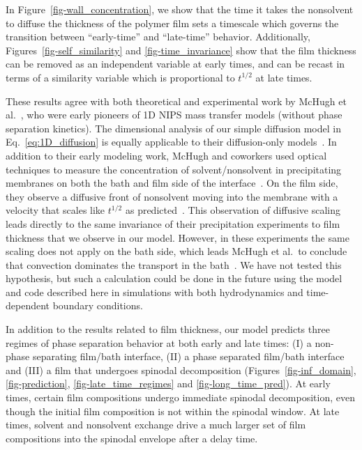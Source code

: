 \documentclass[journal=mamobx, layout=twocolumn]{achemso}
\begin{document}
In Figure~\ref{fig-wall_concentration}, we show that the time it takes the nonsolvent to diffuse the thickness of the polymer film sets a timescale which governs the transition between ``early-time'' and ``late-time'' behavior.
Additionally, Figures~\ref{fig-self_similarity} and \ref{fig-time_invariance} show that the film thickness can be removed as an independent variable at early times, and can be recast in terms of a similarity variable which is proportional to $t^{1/2}$ at late times.

These results agree with both theoretical and experimental work by McHugh et al.~\cite{Tsay1990,McHugh1992,Gaides1992,McHugh1995a}, who were early pioneers of 1D NIPS mass transfer models (without phase separation kinetics). 
The dimensional analysis of our simple diffusion model in Eq.~\ref{eq:1D_diffusion} is equally applicable to their diffusion-only models~\cite{Tsay1990}.
In addition to their early modeling work, McHugh and coworkers used optical techniques to measure the concentration of solvent/nonsolvent in precipitating membranes on both the bath and film side of the interface~\cite{McHugh1992}.
On the film side, they observe a diffusive front of nonsolvent moving into the membrane with a velocity that scales like $t^{1/2}$ as predicted~\cite{McHugh1992,McHugh1995a}.
This observation of diffusive scaling leads directly to the same invariance of their precipitation experiments to film thickness that we observe in our model.
However, in these experiments the same scaling does not apply on the bath side, which leads McHugh et al.\ to conclude that convection dominates the transport in the bath~\cite{Gaides1992}.
We have not tested this hypothesis, but such a calculation could be done in the future using the model and code described here in simulations with both hydrodynamics and time-dependent boundary conditions.

In addition to the results related to film thickness, our model predicts three regimes of phase separation behavior at both early and late times: (I) a non-phase separating film/bath interface, (II) a phase separated film/bath interface and (III) a film that undergoes spinodal decomposition (Figures~\ref{fig-inf_domain}, \ref{fig-prediction}, \ref{fig-late_time_regimes} and \ref{fig-long_time_pred}).
At early times, certain film compositions undergo immediate spinodal decomposition, even though the initial film composition is  not within the spinodal window.
At late times, solvent and nonsolvent exchange drive a much larger set of film compositions into the spinodal envelope after a delay time.
\end{document}

